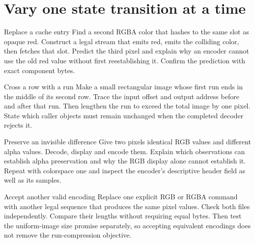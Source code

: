 \section{Vary one state transition at a time}
\begin{MARSExercise}{Replace a cache entry}
Find a second RGBA color that hashes to the same slot as opaque red. Construct a legal
stream that emits red, emits the colliding color, then fetches that slot. Predict the
third pixel and explain why an encoder cannot use the old red value without first
reestablishing it. Confirm the prediction with exact component bytes.
\end{MARSExercise}

\begin{MARSExercise}{Cross a row with a run}
Make a small rectangular image whose first run ends in the middle of its second row.
Trace the input offset and output address before and after that run. Then lengthen the
run to exceed the total image by one pixel. State which caller objects must remain
unchanged when the completed decoder rejects it.
\end{MARSExercise}

\begin{MARSExercise}{Preserve an invisible difference}
Give two pixels identical RGB values and different alpha values. Decode, display and
encode them. Explain which observations can establish alpha preservation and why the
RGB display alone cannot establish it. Repeat with colorspace one and inspect the
encoder's descriptive header field as well as its samples.
\end{MARSExercise}

\begin{MARSExercise}{Accept another valid encoding}
Replace one explicit RGB or RGBA command with another legal sequence that produces the
same pixel values. Check both files independently. Compare their lengths without
requiring equal bytes. Then test the uniform-image size promise separately, so accepting
equivalent encodings does not remove the run-compression objective.
\end{MARSExercise}

